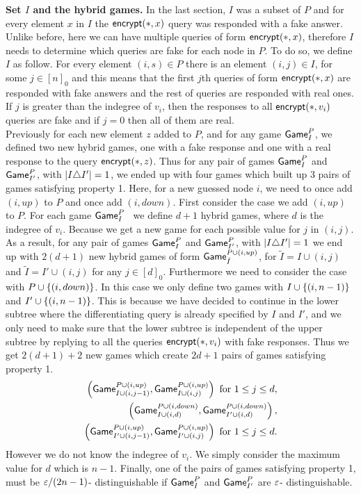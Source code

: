 \documentclass{article}
\newcommand{\encrypt}{{\sf encrypt}}
\newcommand{\game}{{\sf Game}}
\newcommand{\dgg}[2]{\game_{#1}^{#2}}
\newcommand{\gpi}{$\game^P_I$}
\begin{document}
\noindent \textbf{Set $I$ and the hybrid games.} In the last section, $I$ was a subset of $P$ and for every element $x$ in $I$ the $\encrypt(*,x)$ query was responded with a fake answer. Unlike before, here we can have multiple queries of form $\encrypt(*,x)$, therefore $I$ needs to determine which queries are fake for each node in $P$. To do so, we define $I$ as follow. For every element $(i,s)\in P$ there is an element $(i,j)\in I$, for some $j\in [n]_0$ and this means that the first $j$th queries of form $\encrypt(*,x)$ are responded with fake answers and the rest of queries are responded with real ones. If $j$ is greater than the indegree of $v_i$, then the responses to all $\encrypt(*,v_i)$ queries are fake and if $j=0$ then all of them are real. \\ 

Previously for each new element $z$ added to $P$, and for any game \gpi, we defined two new hybrid games, one with a fake response and one with a real response to the query $\encrypt(*,z)$. Thus for any pair of games $\dgg{I}{P}$ and $\dgg{I'}{P}$, with $\left| I \triangle I' \right|=1$, we ended up with four games which built up 3 pairs of games satisfying property 1. Here, for a new guessed node $i$, we need to once add $(i,up) $ to $P$ and once add $(i,down)$. First consider the case we add $(i,up)$ to $P$. For each game \gpi~ we define $d+1$ hybrid games, where $d$ is the indegree of $v_i$. Because we get a new game for each possible value for $j$ in $(i,j)$. As a result, for any pair of games $\dgg{I}{P}$ and $\dgg{I'}{P}$, with $\left| I \triangle I' \right|=1$ we end up with $2(d+1)$ new hybrid games of form $\dgg{\tilde{I}}{P\cup (i,up)}$, for $\tilde{I}=I\cup (i,j)$ and $\tilde{I}=I'\cup (i,j)$ for any $j\in [d]_0$. Furthermore we need to consider the case with $P\cup \left\{ (i,down) \right\}$. In this case we only define two games with $I\cup \left\{ (i,n-1) \right\}$ and $I'\cup \left\{ (i,n-1) \right\}$. This is because we have decided to continue in the lower subtree where the differentiating query is already specified by $I$ and $I'$, and we only need to make sure that the lower subtree is independent of the upper subtree by replying to all the queries $\encrypt(*,v_i)$ with fake responses. Thus we get $2(d+1)+2$ new games which create $2d+1$ pairs of games satisfying property 1.
\begin{align*}
\rob{\dgg{I\cup (i,j-1)}{P\cup (i,up)},\dgg{I\cup (i,j)}{P\cup (i,up)} }\text{ for } 1\leq j \leq d,  \\ 
\rob{\dgg{I\cup (i,d)}{P\cup (i,down)},\dgg{I'\cup (i,d)}{P\cup (i,down)}}, \\
\rob{\dgg{I'\cup (i,j-1)}{P\cup (i,up)},\dgg{I'\cup (i,j)}{P\cup (i,up)}} \text{ for } 1\leq j \leq d.  \\ 
\end{align*}
However we do not know the indegree of $v_i$. We simply consider the maximum value for $d$ which is $n-1$. Finally, one of the pairs of games satisfying property 1, must be $\varepsilon/(2n-1)$- distinguishable if $\dgg{I}{P}$ and $\dgg{I'}{P}$ are $\varepsilon$- distinguishable. \\
\end{document}
